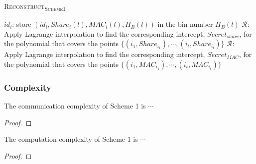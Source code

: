 \begin{algorithm}[h!]
	 \caption[\textsc{Reconstruct\textsubscript{Scheme1}}]{\textsc{Reconstruct\textsubscript{Scheme1}}}\label{alg:S1_Recon}
	 	\begin{algorithmic}[1]
                    \State $id_i$: store $(id_i, Share_i(l), MAC_i(l), H_B(l))$ in the bin number $H_B(l)$
                    \State
	 	        \EndFor
	 	    \EndFor 
	 	            \State $\mathcal{R}$: Apply Lagrange interpolation to  find the corresponding intercept, $Secret_{share}$, for the polynomial that covers the points $\{({i_1}, Share_{i_1}), \cdots, ({i_t}, Share_{i_t})\}$
	 	            \State $\mathcal{R}$: Apply Lagrange interpolation to  find the corresponding intercept, $Secret_{MAC}$, for the polynomial that covers the points $\{({i_1}, MAC_{i_1}), \cdots, ({i_t}, MAC_{i_t})\}$
	 	            \EndIf 
	 	        \EndFor
	 	    \EndFor
	 	\end{algorithmic}
\end{algorithm}


\subsubsection{Complexity}
\begin{theorem}
The communication complexity of Scheme 1 is $\cdots$
\end{theorem}
\begin{proof}
\end{proof}
\begin{theorem}
The computation complexity of Scheme 1 is $\cdots$
\end{theorem}
\begin{proof}
\end{proof}

